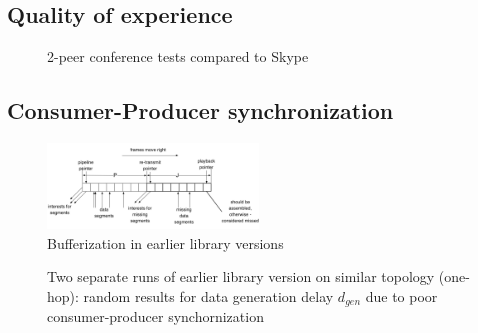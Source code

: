 \documentclass{icn/sig-alternate-2012} %
\begin{document}
\subsection{Quality of experience}
\begin{figure}[t!]
\centering
\begin{tiny}
\def\svgwidth{0.5\textwidth}
\end{tiny}
\vspace{-18pt}
\caption{2-peer conference tests compared to Skype}
\label{fig:tests-skype}
\end{figure}


\subsection{Consumer-Producer synchronization}

\begin{figure}[t!]
\centering
\includegraphics[width=0.5\textwidth]{buffer}
\caption{Bufferization in earlier library versions}
\label{fig:old-buf}
\end{figure}

\begin{figure}[t!]
\centering


\caption{Two separate runs of earlier library version on similar topology (one-hop): random results for data generation delay $d_{gen}$ due to poor consumer-producer synchornization}
\label{fig:dgen}
\end{figure}
\end{document}
